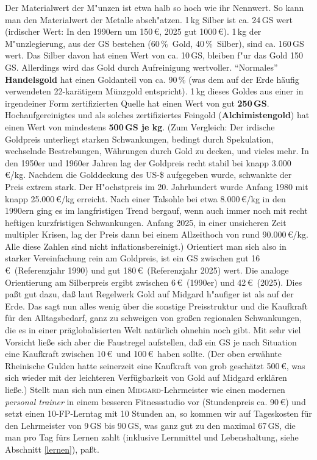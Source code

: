 \documentclass[10pt,a4paper,germanpar]{article}
\begin{document}
Der Materialwert der M"unzen ist etwa halb so hoch wie ihr Nennwert.
So kann man den Materialwert der Metalle absch"atzen. 1\,kg Silber ist
ca. 24\,GS wert (irdischer Wert: In den 1990ern um 150\,\euro, 2025
gut 1000\,\euro). 1\,kg der M"unzlegierung, aus der GS bestehen
(60\,\%\ Gold, 40\,\%\ Silber), sind ca. 160\,GS wert. Das Silber
davon hat einen Wert von ca. 10\,GS, bleiben f"ur das Gold 150\,GS.
Allerdings wird das Gold durch Aufreinigung wertvoller. "`Normales"'
\textbf{Handelsgold} hat einen Goldanteil von ca. 90\,\% (was dem auf
der Erde häufig verwendeten 22-karätigem Münzgold entspricht). 1\,kg
dieses Goldes aus einer in irgendeiner Form zertifizierten Quelle hat
einen Wert von gut \textbf{250\,GS}. Hochaufgereinigtes und als
solches zertifiziertes Feingold (\textbf{Alchimistengold}) hat einen
Wert von mindestens \textbf{500\,GS je kg}. (Zum Vergleich: Der
irdische Goldpreis unterliegt starken Schwankungen, bedingt durch
Spekulation, wechselnde Bestrebungen, Währungen durch Gold zu decken,
und vieles mehr. In den 1950er und 1960er Jahren lag der Goldpreis
recht stabil bei knapp 3.000\,\euro/kg. Nachdem die Golddeckung des
US-\$ aufgegeben wurde, schwankte der Preis extrem stark. Der
H"ochstpreis im 20. Jahrhundert wurde Anfang 1980 mit knapp
25.000\,\euro/kg erreicht. Nach einer Talsohle bei etwa
8.000\,\euro/kg in den 1990ern ging es im langfristigen Trend bergauf,
wenn auch immer noch mit recht heftigen kurzfristigen Schwankungen.
Anfang 2025, in einer unsicheren Zeit multipler Krisen, lag der Preis
dann bei einem Allzeithoch von rund 90.000\,\euro/kg. Alle diese
Zahlen sind nicht inflationsbereinigt.) Orientiert man sich also in
starker Vereinfachung rein am Goldpreis, ist ein GS zwischen gut
16\,\euro\ (Referenzjahr 1990) und gut 180\,\euro\ (Referenzjahr 2025)
wert. Die analoge Orientierung am Silberpreis ergibt zwischen
6\,\euro\ (1990er) und 42\,\euro\ (2025). Dies paßt gut dazu, daß laut
Regelwerk Gold auf Midgard h"aufiger ist als auf der Erde. Das sagt
nun alles wenig über die sonstige Preisstruktur und die Kaufkraft für
den Alltagsbedarf, ganz zu schweigen von großen regionalen
Schwankungen, die es in einer präglobalisierten Welt natürlich ohnehin
noch gibt. Mit sehr viel Vorsicht ließe sich aber die Faustregel
aufstellen, daß ein GS je nach Situation eine Kaufkraft zwischen
10\,\euro\ und 100\,\euro\ haben sollte. (Der oben erwähnte Rheinische
Gulden hatte seinerzeit eine Kaufkraft von grob geschätzt 500\,\euro,
was sich wieder mit der leichteren Verfügbarkeit von Gold auf Midgard
erklären ließe.) Stellt man sich nun einen
\textsc{Midgard}-Lehrmeister wie einen modernen \emph{personal
trainer} in einem besseren Fitnessstudio vor (Stundenpreis ca.
90\,\euro) und setzt einen 10-FP-Lerntag mit 10 Stunden an, so kommen
wir auf Tageskosten für den Lehrmeister von 9\,GS bis 90\,GS, was ganz
gut zu den maximal 67\,GS, die man pro Tag fürs Lernen zahlt
(inklusive Lernmittel und Lebenshaltung, siehe Abschnitt
\ref{lernen}), paßt.
\end{document}
